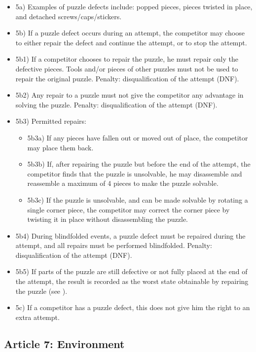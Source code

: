 \begin{itemize}
\item
  5a) Examples of puzzle defects include: popped pieces, pieces twisted
  in place, and detached screws/caps/stickers.
\item
  5b) If a puzzle defect occurs during an attempt, the competitor may
  choose to either repair the defect and continue the attempt, or to
  stop the attempt.
\item
  5b1) If a competitor chooses to repair the puzzle, he must repair only
  the defective pieces. Tools and/or pieces of other puzzles must not be
  used to repair the original puzzle. Penalty: disqualification of the
  attempt (DNF).
\item
  5b2) Any repair to a puzzle must not give the competitor any advantage
  in solving the puzzle. Penalty: disqualification of the attempt (DNF).
\item
  5b3) Permitted repairs:

  \begin{itemize}
  \item
    5b3a) If any pieces have fallen out or moved out of place, the
    competitor may place them back.
  \item
    5b3b) If, after repairing the puzzle but before the end of the
    attempt, the competitor finds that the puzzle is unsolvable, he may
    disassemble and reassemble a maximum of 4 pieces to make the puzzle
    solvable.
  \item
    5b3c) If the puzzle is unsolvable, and can be made solvable by
    rotating a single corner piece, the competitor may correct the
    corner piece by twisting it in place without disassembling the
    puzzle.
  \end{itemize}
\item
  5b4) During blindfolded events, a puzzle defect must be repaired
  during the attempt, and all repairs must be performed blindfolded.
  Penalty: disqualification of the attempt (DNF).
\item
  5b5) If parts of the puzzle are still defective or not fully placed at
  the end of the attempt, the result is recorded as the worst state
  obtainable by repairing the puzzle (see ).
\item
  5c) If a competitor has a puzzle defect, this does not give him the
  right to an extra attempt.
\end{itemize}

\subsection{ Article 7: Environment}

